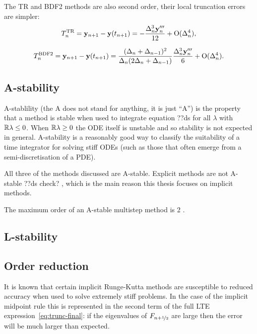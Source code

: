 The TR\cite[pg. 261]{GreshoSani} and BDF2\cite[pg. 715]{GreshoSani} methods are also second order, their local truncation errors are simpler:
\begin{equation}
  \label{eq:tr-lte}
  T_n^{\text{TR}} = \mathbf{y}_{n+1} - \mathbf{y}(t_{n+1}) = -\frac{\Delta_{n}^3 \mathbf{y}_n'''}{12}
  + \text{O}(\Delta_{n}^4),
\end{equation}

\begin{equation}
  \label{eq:bdf2-lte}
  T_n^{\text{BDF2}} = \mathbf{y}_{n+1} - \mathbf{y}(t_{n+1}) = \frac{(\Delta_{n} + \Delta_{n-1})^2}{\Delta_{n}(2\Delta_{n} + \Delta_{n-1})}
  \frac{\Delta_{n}^3 \mathbf{y}_n'''}{6}
  + \text{O}(\Delta_{n}^4).
\end{equation}


\subsection{A-stability}

A-stablility (the A does not stand for anything, it is just ``A'') is the property that a method is stable when used to integrate equation ??ds for all $\lambda$ with $\mathbb{R}{\lambda} \leq 0$. 
When $\mathbb{R}{\lambda} \geq 0$ the ODE itself is unstable and so stability is not expected in general.
A-stability is a reasonably good way to classify the suitability of a time integrator for solving stiff ODEs (such as those that often emerge from a semi-discretisation of a PDE).

All three of the methods discussed are A-stable.
Explicit methods are not A-stable ??ds check? \cite{??ds}, which is the main reason this thesis focuses on implicit methods.

The maximum order of an A-stable multistep method is 2 \cite[??ds]{HairerNorsettWanner}.



\subsection{L-stability}
\label{sec:imr-l-stability}


\subsection{Order reduction}

It is known that certain implicit Runge-Kutta methods\cite[pg. 156]{Atkinson1994} are susceptible to reduced accuracy when used to solve extremely stiff problems.
In the case of the implicit midpoint rule this is represented in the second term of the full LTE expression~\eqref{eq:trunc-final}: if the eigenvalues of $F_{n+\nicefrac{1}{2}}$ are large then the error will be much larger than expected.

